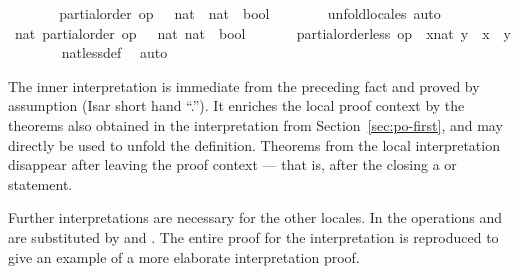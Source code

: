 \begin{isabellebody}
\ {\isacharminus}\isanewline
\ \ \ \ \isamarkupfalse%
\ {\isachardoublequoteopen}partial{\isacharunderscore}order\ {\isacharparenleft}op\ {\isasymle}\ {\isacharcolon}{\isacharcolon}\ nat\ {\isasymRightarrow}\ nat\ {\isasymRightarrow}\ bool{\isacharparenright}{\isachardoublequoteclose}\isanewline
\ \ \ \ \ \ \isamarkupfalse%
\ unfold{\isacharunderscore}locales\ auto\isanewline
\ \ \ \ \isamarkupfalse%
\ \isamarkupfalse%
\ nat{\isacharcolon}\ partial{\isacharunderscore}order\ {\isachardoublequoteopen}op\ {\isasymle}\ {\isacharcolon}{\isacharcolon}\ {\isacharbrackleft}nat{\isacharcomma}\ nat{\isacharbrackright}\ {\isasymRightarrow}\ bool{\isachardoublequoteclose}\ \isacommand{{\isachardot}}\isamarkupfalse%
\isanewline
\ \ \ \ \isamarkupfalse%
\ {\isachardoublequoteopen}partial{\isacharunderscore}order{\isachardot}less\ op\ {\isasymle}\ {\isacharparenleft}x{\isacharcolon}{\isacharcolon}nat{\isacharparenright}\ y\ {\isacharequal}\ {\isacharparenleft}x\ {\isacharless}\ y{\isacharparenright}{\isachardoublequoteclose}\isanewline
\ \ \ \ \ \ \isamarkupfalse%
\ nat{\isachardot}less{\isacharunderscore}def\ \isamarkupfalse%
\ auto\isanewline
\ \ \isamarkupfalse%
%
\endisatagvisible
{\isafoldvisible}%
%
\isadelimvisible
%
\endisadelimvisible
%
\begin{isamarkuptext}%
The inner interpretation is immediate from the preceding fact
  and proved by assumption (Isar short hand ``.'').  It enriches the
  local proof context by the theorems
  also obtained in the interpretation from Section~\ref{sec:po-first},
  and  may directly be used to unfold the
  definition.  Theorems from the local interpretation disappear after
  leaving the proof context --- that is, after the closing a
   or  statement.%
\end{isamarkuptext}%
\isamarkuptrue%
%
\isamarkuptrue%
%
\begin{isamarkuptext}%
Further interpretations are necessary for
  the other locales.  In  the operations \isa{{\isasymsqinter}} and
  \isa{{\isasymsqunion}} are substituted by  and
  .  The entire proof for the
  interpretation is reproduced to give an example of a more
  elaborate interpretation proof.%
\end{isamarkuptext}%
\isamarkuptrue%
%
\isadelimvisible
\ \ %
\endisadelimvisible

\end{isabellebody}

